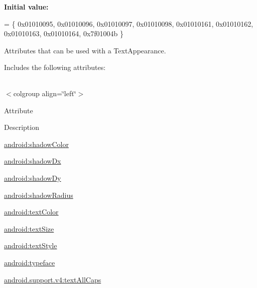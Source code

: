 {\bfseries Initial value\+:}
\begin{DoxyCode}
= \{
            0x01010095, 0x01010096, 0x01010097, 0x01010098,
            0x01010161, 0x01010162, 0x01010163, 0x01010164,
            0x7f01004b
        \}
\end{DoxyCode}
Attributes that can be used with a Text\+Appearance. 

Includes the following attributes\+:

\tabulinesep=1mm
\begin{longtabu} spread 0pt [c]{*{0}{|X[-1]}|}
\hline
\end{longtabu}
$<$colgroup align=\char`\"{}left\char`\"{}$>$ 

Attribute

Description 

{\ttfamily \hyperlink{classandroid_1_1support_1_1v4_1_1R_1_1styleable_a318e5701b3481a77b72df6e397f667e7}{android\+:shadow\+Color}}

{\ttfamily \hyperlink{classandroid_1_1support_1_1v4_1_1R_1_1styleable_aede7737f192898cea28cfa504def7c4c}{android\+:shadow\+Dx}}

{\ttfamily \hyperlink{classandroid_1_1support_1_1v4_1_1R_1_1styleable_ad8fae45d7f1f386895cd3d3387477bb8}{android\+:shadow\+Dy}}

{\ttfamily \hyperlink{classandroid_1_1support_1_1v4_1_1R_1_1styleable_a6d669faeb8b3585d3807aa0124a6bf14}{android\+:shadow\+Radius}}

{\ttfamily \hyperlink{classandroid_1_1support_1_1v4_1_1R_1_1styleable_ad91d5229f5579d10576dd454b5a76955}{android\+:text\+Color}}

{\ttfamily \hyperlink{classandroid_1_1support_1_1v4_1_1R_1_1styleable_a040fc8f325c7f3437cb0de7391a9f66b}{android\+:text\+Size}}

{\ttfamily \hyperlink{classandroid_1_1support_1_1v4_1_1R_1_1styleable_ad2a5ecd007f593b55beb33c50e15db62}{android\+:text\+Style}}

{\ttfamily \hyperlink{classandroid_1_1support_1_1v4_1_1R_1_1styleable_a9e3a6684a7a098b28524ba5b3ce100f9}{android\+:typeface}}

{\ttfamily \hyperlink{classandroid_1_1support_1_1v4_1_1R_1_1styleable_a1e1460f50d695fa2b57fa98b9d12a63e}{android.\+support.\+v4\+:text\+All\+Caps}}

